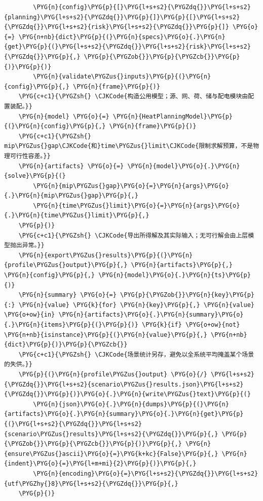 \begin{Verbatim}
        \PYG{n}{config}\PYG{p}{[}\PYG{l+s+s2}{\PYGZdq{}}\PYG{l+s+s2}{planning}\PYG{l+s+s2}{\PYGZdq{}}\PYG{p}{]}\PYG{p}{[}\PYG{l+s+s2}{\PYGZdq{}}\PYG{l+s+s2}{risk}\PYG{l+s+s2}{\PYGZdq{}}\PYG{p}{]} \PYG{o}{=} \PYG{n+nb}{dict}\PYG{p}{(}\PYG{n}{specs}\PYG{o}{.}\PYG{n}{get}\PYG{p}{(}\PYG{l+s+s2}{\PYGZdq{}}\PYG{l+s+s2}{risk}\PYG{l+s+s2}{\PYGZdq{}}\PYG{p}{,} \PYG{p}{\PYGZob{}}\PYG{p}{\PYGZcb{}}\PYG{p}{)}\PYG{p}{)}
        \PYG{n}{validate\PYGZus{}inputs}\PYG{p}{(}\PYG{n}{config}\PYG{p}{,} \PYG{n}{frame}\PYG{p}{)}
    \PYG{c+c1}{\PYGZsh{} \CJKCode{构造公用模型；源、网、荷、储与配电模块由配置装配。}}
    \PYG{n}{model} \PYG{o}{=} \PYG{n}{HeatPlanningModel}\PYG{p}{(}\PYG{n}{config}\PYG{p}{,} \PYG{n}{frame}\PYG{p}{)}
    \PYG{c+c1}{\PYGZsh{} mip\PYGZus{}gap\CJKCode{和}time\PYGZus{}limit\CJKCode{限制求解预算，不是物理可行性容差。}}
    \PYG{n}{artifacts} \PYG{o}{=} \PYG{n}{model}\PYG{o}{.}\PYG{n}{solve}\PYG{p}{(}
        \PYG{n}{mip\PYGZus{}gap}\PYG{o}{=}\PYG{n}{args}\PYG{o}{.}\PYG{n}{mip\PYGZus{}gap}\PYG{p}{,}
        \PYG{n}{time\PYGZus{}limit}\PYG{o}{=}\PYG{n}{args}\PYG{o}{.}\PYG{n}{time\PYGZus{}limit}\PYG{p}{,}
    \PYG{p}{)}
    \PYG{c+c1}{\PYGZsh{} \CJKCode{导出所得解及其实际输入；无可行解会由上层模型抛出异常。}}
    \PYG{n}{export\PYGZus{}results}\PYG{p}{(}\PYG{n}{profile\PYGZus{}output}\PYG{p}{,} \PYG{n}{artifacts}\PYG{p}{,} \PYG{n}{config}\PYG{p}{,} \PYG{n}{model}\PYG{o}{.}\PYG{n}{ts}\PYG{p}{)}
    \PYG{n}{summary} \PYG{o}{=} \PYG{p}{\PYGZob{}}\PYG{n}{key}\PYG{p}{:} \PYG{n}{value} \PYG{k}{for} \PYG{n}{key}\PYG{p}{,} \PYG{n}{value} \PYG{o+ow}{in} \PYG{n}{artifacts}\PYG{o}{.}\PYG{n}{summary}\PYG{o}{.}\PYG{n}{items}\PYG{p}{(}\PYG{p}{)} \PYG{k}{if} \PYG{o+ow}{not} \PYG{n+nb}{isinstance}\PYG{p}{(}\PYG{n}{value}\PYG{p}{,} \PYG{n+nb}{dict}\PYG{p}{)}\PYG{p}{\PYGZcb{}}
    \PYG{c+c1}{\PYGZsh{} \CJKCode{场景统计另存，避免以全系统平均掩盖某个场景的失供。}}
    \PYG{p}{(}\PYG{n}{profile\PYGZus{}output} \PYG{o}{/} \PYG{l+s+s2}{\PYGZdq{}}\PYG{l+s+s2}{scenario\PYGZus{}results.json}\PYG{l+s+s2}{\PYGZdq{}}\PYG{p}{)}\PYG{o}{.}\PYG{n}{write\PYGZus{}text}\PYG{p}{(}
        \PYG{n}{json}\PYG{o}{.}\PYG{n}{dumps}\PYG{p}{(}\PYG{n}{artifacts}\PYG{o}{.}\PYG{n}{summary}\PYG{o}{.}\PYG{n}{get}\PYG{p}{(}\PYG{l+s+s2}{\PYGZdq{}}\PYG{l+s+s2}{scenario\PYGZus{}results}\PYG{l+s+s2}{\PYGZdq{}}\PYG{p}{,} \PYG{p}{\PYGZob{}}\PYG{p}{\PYGZcb{}}\PYG{p}{)}\PYG{p}{,} \PYG{n}{ensure\PYGZus{}ascii}\PYG{o}{=}\PYG{k+kc}{False}\PYG{p}{,} \PYG{n}{indent}\PYG{o}{=}\PYG{l+m+mi}{2}\PYG{p}{)}\PYG{p}{,}
        \PYG{n}{encoding}\PYG{o}{=}\PYG{l+s+s2}{\PYGZdq{}}\PYG{l+s+s2}{utf\PYGZhy{}8}\PYG{l+s+s2}{\PYGZdq{}}\PYG{p}{,}
    \PYG{p}{)}
\end{Verbatim}
